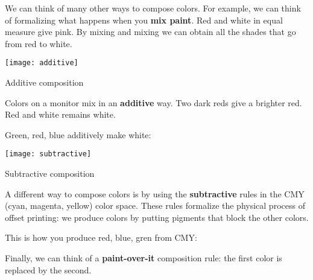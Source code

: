 
We can think of many other ways to compose colors.
For example, we can think of formalizing what happens when you \textbf{mix paint}.
Red and white in equal measure give pink.
By mixing and mixing we can obtain all the shades that go from red to white.

\begin{center}
\end{center}

\begin{marginfigure}
  \texttt{[image: additive]}
  \caption{Additive composition}
\end{marginfigure}

Colors on a monitor mix in an \textbf{additive} way. Two dark reds give a brighter red.
Red and white remains white.

\begin{center}
\end{center}

Green, red, blue additively make white:


\begin{marginfigure}
  \texttt{[image: subtractive]}
  \caption{Subtractive composition}
\end{marginfigure}

A different way to compose colors is by using the \textbf{subtractive} rules in the CMY (cyan, magenta, yellow) color space.
These rules formalize the physical process of offset printing: we produce colors by putting pigments that block the other colors.


\begin{center}
\end{center}

This is how you produce red, blue, gren from CMY:


\begin{center}
\end{center}

Finally, we can think of a \textbf{paint-over-it} composition rule: the first color is replaced by the second.

\begin{center}
\end{center}


